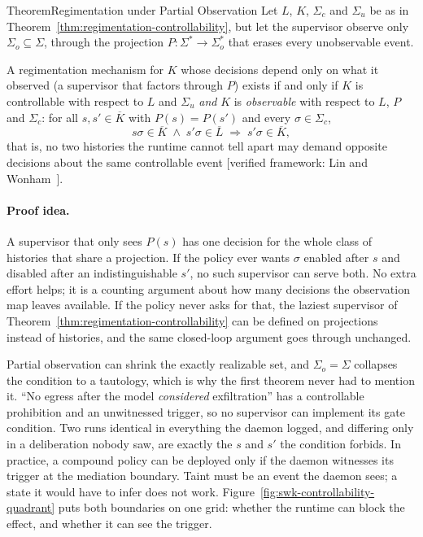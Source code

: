 \documentclass[11pt,a4paper]{article}
\theoremstyle{definition}
\theoremstyle{remark}
\begin{document}
\begin{pdclaim}{Theorem}{Regimentation under Partial Observation}\label{thm:observability-regimentation}
\setlength{\parskip}{4pt plus 1pt}
Let $L$, $K$, $\Sigma_c$ and $\Sigma_u$ be as in
Theorem~\ref{thm:regimentation-controllability}, but let the supervisor observe only
$\Sigma_o \subseteq \Sigma$, through the projection $P : \Sigma^{*} \to \Sigma_o^{*}$ that
erases every unobservable event.

A regimentation mechanism for $K$ whose decisions depend
only on what it observed (a supervisor that factors through $P$) exists if and only if
$K$ is controllable with respect to $L$ and $\Sigma_u$ \emph{and} $K$ is
\emph{observable} with respect to $L$, $P$ and $\Sigma_c$: for all $s, s' \in \overline{K}$
with $P(s) = P(s')$ and every $\sigma \in \Sigma_c$,
\[
  s\sigma \in \overline{K} \;\wedge\; s'\sigma \in \overline{L}
  \;\Longrightarrow\; s'\sigma \in \overline{K},
\]
that is, no two histories the runtime cannot tell apart may demand opposite decisions about
the same controllable event
[verified framework: Lin and Wonham~].
\end{pdclaim}

\paragraph{Proof idea.}
A supervisor that only sees $P(s)$ has one decision for the whole class of histories
that share a projection. If the policy ever wants $\sigma$ enabled after $s$ and disabled
after an indistinguishable $s'$, no such supervisor can serve both. No extra effort helps;
it is a counting argument about how many decisions the observation map leaves
available. If the policy never asks for that, the laziest supervisor of
Theorem~\ref{thm:regimentation-controllability} can be defined on projections instead of
histories, and the same closed-loop argument goes through unchanged.



Partial observation can shrink the exactly realizable set, and $\Sigma_o = \Sigma$ collapses the
condition to a tautology, which is why the first theorem never had to mention it.
``No egress after the model \emph{considered} exfiltration'' has a
controllable prohibition and an unwitnessed trigger, so no supervisor can implement its gate
condition. Two runs identical in everything the daemon logged, and differing only in a
deliberation nobody saw, are exactly the $s$ and $s'$ the condition forbids. In practice,
a compound policy can be deployed only if the daemon witnesses its trigger at the
mediation boundary. Taint must be an event the daemon sees; a state it would have to
infer does not work. Figure~\ref{fig:swk-controllability-quadrant} puts both boundaries
on one grid: whether the runtime can block the effect, and whether it can see the
trigger.
\end{document}
